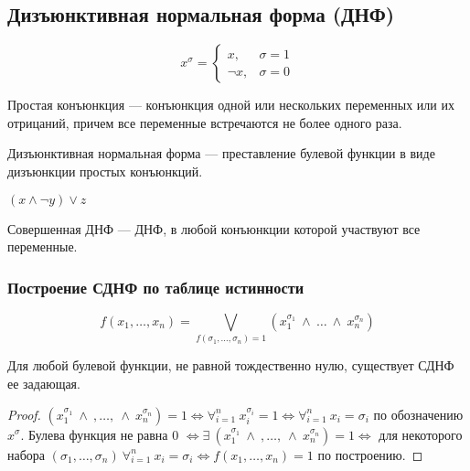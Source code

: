 \subsection{Дизъюнктивная нормальная форма (ДНФ)}

\begin{theorem-non}
    \begin{equation*}
        x^{\sigma} = 
        \begin{cases}
            x, &\text{$\sigma = 1$}\\
            \neg x, &\text{$\sigma = 0$}
        \end{cases}
    \end{equation*}
\end{theorem-non}

\begin{defn}
    Простая конъюнкция --- конъюнкция одной или нескольких переменных или их отрицаний, причем все переменные встречаются не более одного раза.
\end{defn}

\begin{defn}
    Дизъюнктивная  нормальная форма --- преставление булевой функции в виде дизъюнкции простых конъюнкций. 
\end{defn}

\begin{example}
    $(x \wedge \neg y) \vee z$
\end{example}

\begin{defn}
    Совершенная ДНФ --- ДНФ, в любой конъюнкции которой участвуют все переменные.
\end{defn}

\subsubsection*{Построение СДНФ по таблице истинности}

\[f(x_1, \ldots, x_n) = \bigvee_{f(\sigma_1, \ldots, \sigma_n) = 1} 
(x_1^{\sigma_1}\ \wedge\  \ldots\ \wedge\ x_n^{\sigma_n})\]

\begin{theorem}
    Для любой булевой функции, не равной тождественно нулю, существует СДНФ ее задающая.
\end{theorem}

\begin{proof} 
    $(x_1^{\sigma_1}\ \wedge\ , \ldots,\ \wedge\ x_n^{\sigma_n}) = 1 \iff \forall_{i=1}^{n} \ x_i^{\sigma_i} = 1 \iff \forall_{i=1}^{n} \ x_i = \sigma_i$ по обозначению $x^{\sigma}$. 
    Булева функция не равна 0 $\iff \exists\ (x_1^{\sigma_1} \ \wedge\ , \ldots,\ \wedge\ x_n^{\sigma_n}) = 1 \iff$ для некоторого набора $(\sigma_1, \ldots, \sigma_n)\ \forall_{i=1}^{n}\ x_i = \sigma_i \iff f(x_1, \ldots, x_n) = 1$ по построению. 
\end{proof}
